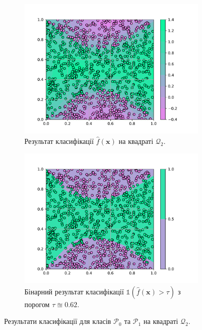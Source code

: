 \begin{figure}
	\centering
	\begin{subfigure}{0.49\textwidth}
		\centering
		\includegraphics[width=0.99\textwidth]{code/classification-cont-prediction.pdf}
		\caption{Результат класифікації $\hat{f}(\mathbf{x})$ на квадраті $\mathcal{Q}_2$.}
	\end{subfigure}
	\begin{subfigure}{0.49\textwidth}
		\centering
		\includegraphics[width=0.99\textwidth]{code/classification-discr-prediction.pdf}
		\caption{Бінарний результат класифікації $\mathds{1}(\hat{f}(\mathbf{x})>\tau)$ з порогом $\tau \approxeq 0.62$.}
	\end{subfigure}
	\caption{Результати класифікації для класів $\mathcal{P}_0$ та $\mathcal{P}_1$ на квадраті $\mathcal{Q}_2$.}
	\label{fig:classification_result}
\end{figure}

